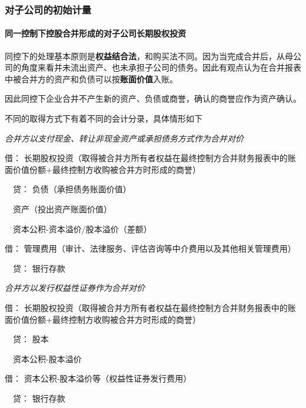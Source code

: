 \documentclass[UTF8,12pt]{ctexart}
\newenvironment{Dr}{\noindent 借：}{\par}
\newenvironment{Cr}{\noindent \ \ 贷：}{\par}
\numberwithin{equation}{section} %
\numberwithin{figure}{section}
\numberwithin{table}{section}
\begin{document}
	\subsubsection{对子公司的初始计量}
	\paragraph{同一控制下控股合并形成的对子公司长期股权投资}
	同控下的处理基本原则是\textbf{权益结合法}，和购买法不同。因为当完成合并后，从母公司的角度来看并未流出资产、也未承担子公司的债务。因此有观点认为在合并报表中被合并方的资产和负债可以按\textbf{账面价值}入账。
	
	因此同控下企业合并不产生新的资产、负债或商誉，确认的商誉应作为资产确认。
	
	不同的取得方式下有着不同的会计分录，具体情形如下
	
	\textit{合并方以支付现金、转让非现金资产或承担债务方式作为合并对价}
	
	\begin{Dr}
		长期股权投资（取得被合并方所有者权益在最终控制方合并财务报表中的账面价值份额+最终控制方收购被合并方时形成的商誉）
	\end{Dr}
	\begin{Cr}
		负债（承担债务账面价值）
		
		\ \ 资产（投出资产账面价值）
		
		\ \ 资本公积-资本溢价/股本溢价（差额）
	\end{Cr}
	
	\begin{Dr}
		管理费用（审计、法律服务、评估咨询等中介费用以及其他相关管理费用）
	\end{Dr}
	\begin{Cr}
		银行存款
	\end{Cr}
	
	\textit{合并方以发行权益性证券作为合并对价}
	
	\begin{Dr}
		长期股权投资（取得被合并方所有者权益在最终控制方合并财务报表中的账面价值份额+最终控制方收购被合并方时形成的商誉）
	\end{Dr}
	\begin{Cr}
		股本
		
		\ \ 资本公积-股本溢价
	\end{Cr}
	
	\begin{Dr}
		资本公积-股本溢价等（权益性证券发行费用）
	\end{Dr}
	\begin{Cr}
		银行存款
	\end{Cr}
	
\end{document}
